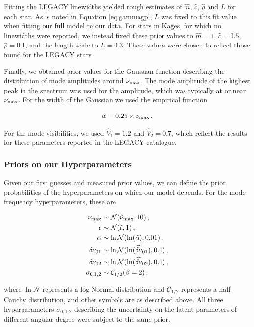 \documentclass[12pt]{article}
\newcommand{\numax}{\mbox{$\nu_{\rm max}$}\xspace}
\begin{document}
Fitting the LEGACY linewidths yielded rough estimates of $\hat{m}$, $\hat{c}$, $\hat{\rho}$ and $L$ for each star. As is noted in Equation \ref{eq:gammagp}, $L$ was fixed to this fit value when fitting our full model to our data. For stars in Kages, for which no linewidths were reported, we instead fixed these prior values to $\hat{m} = 1$, $\hat{c} = 0.5$, $\hat{\rho} = 0.1$, and the length scale to $L = 0.3$. These values were chosen to reflect those found for the LEGACY stars.

Finally, we obtained prior values for the Gaussian function describing the distribution of mode amplitudes around \numax. The mode amplitude of the highest peak in the spectrum was used for the amplitude, which was typically at or near \numax. For the width of the Gaussian we used the empirical function \cite{lund+2017}

\begin{equation}
	\hat{w} = 0.25 \times \numax\, .
\end{equation}

\noindent For the mode visibilities, we used $\hat{V}_1 = 1.2$ and $\hat{V}_2 = 0.7$, which reflect the results for these parameters reported in the LEGACY catalogue.

\subsubsection{Priors on our Hyperparameters}
Given our first guesses and measured prior values, we can define the prior probabilities of the hyperparameters on which our model depends. For the mode frequency hyperparameters, these are

\begin{equation}
	\begin{split}
		\numax &\sim \mathcal{N}(\hat{\nu}_{\rm max}, 10)\, ,\\
		\epsilon &\sim \mathcal{N}(\hat{\epsilon}, 1)\, ,\\
		\alpha &\sim \ln\mathcal{N}(\ln(\hat{\alpha}), 0.01)\, ,\\
		\delta\nu_{01} &\sim \ln\mathcal{N}(\ln(\widehat{\delta\nu}_{01}), 0.1)\, ,\\
		\delta\nu_{02} &\sim \ln\mathcal{N}(\ln(\widehat{\delta\nu}_{02}), 0.1)\, ,\\
		\sigma_{0,1,2} &\sim \mathcal{C}_{1/2}(\beta = 2)\, ,
	\end{split}
\end{equation}

\noindent where $\ln\mathcal{N}$ represents a log-Normal distribution and $\mathcal{C}_{1/2}$ represents a half-Cauchy distribution, and other symbols are as described above. All three hyperparameters $\sigma_{0,1,2}$ describing the uncertainty on the latent parameters of different angular degree were subject to the same prior.
\end{document}
